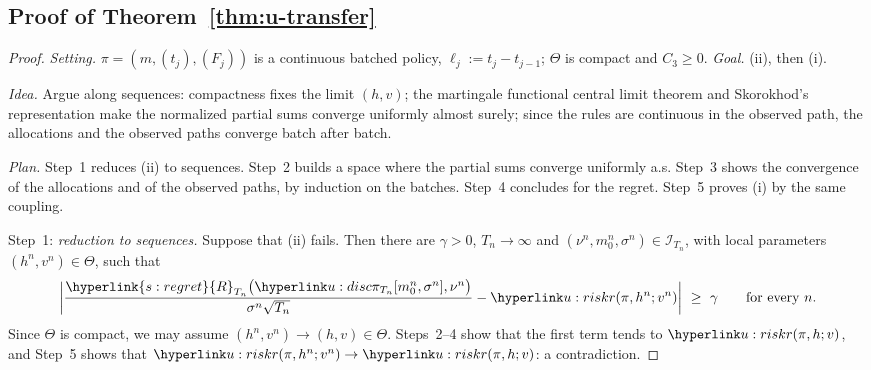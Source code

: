 \documentclass[11pt]{article}
\DeclareRobustCommand{\sy}[2]{{\hyperlink{#1}{#2}}}
\newcommand{\1}{\mathbf{1}}
\begin{document}
\subsection{Proof of Theorem~\ref{thm:u-transfer}}
\begin{proof}
\textit{Setting.} $\pi=(m,(t_j),(F_j))$ is a continuous batched policy, $\ell_j:=t_j-t_{j-1}$; $\Theta$ is compact and $C_3\ge0$. \textit{Goal.} (ii), then (i).

\textit{Idea.} Argue along sequences: compactness fixes the limit $(h,v)$; the martingale functional central limit theorem and Skorokhod's representation make
the normalized partial sums converge uniformly almost surely; since the rules are continuous in the observed path, the allocations and the observed paths
converge batch after batch.

\textit{Plan.} Step~1 reduces (ii) to sequences. Step~2 builds a space where the partial sums converge uniformly a.s. Step~3 shows the convergence of the
allocations and of the observed paths, by induction on the batches. Step~4 concludes for the regret. Step~5 proves (i) by the same coupling.

Step~1: \emph{reduction to sequences.} Suppose that (ii) fails. Then there are $\gamma>0$, $T_n\to\infty$ and $(\nu^n,m^n_0,\sigma^n)\in\mathcal I_{T_n}$, with local
parameters $(h^n,v^n)\in\Theta$, such that
\[
\bigg|\frac{\sy{s:regret}{R}_{T_n}\big(\uDisc{\pi}{T_n}{m^n_0,\sigma^n},\nu^n\big)}{\sigma^n\sqrt{T_n}}-\urk(\pi,h^n;v^n)\bigg|\ \ge\ \gamma\qquad\text{for every }n.
\]
Since $\Theta$ is compact, we may assume $(h^n,v^n)\to(h,v)\in\Theta$. Steps~2--4 show that the first term tends to $\urk(\pi,h;v)$, and Step~5 shows that
$\urk(\pi,h^n;v^n)\to\urk(\pi,h;v)$: a contradiction.


\end{proof}
\end{document}
